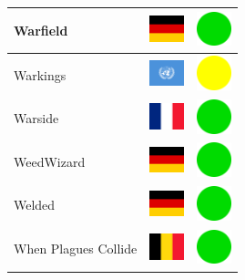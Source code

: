 \documentclass[12pt, a4paper, twoside]{report}
\begin{document}
\begin{center}
\begin{longtable}{|p{5cm}|p{2cm}|p{2cm}|}
 Warfield                                                   & \includegraphics[width=1cm]{../4x3/de} &   \includegraphics[width=1cm]{../likes/y} \\ \hline
 Warkings                                                   & \includegraphics[width=1cm]{../4x3/un} &   \includegraphics[width=1cm]{../likes/m} \\ \hline
 Warside                                                    & \includegraphics[width=1cm]{../4x3/fr} &   \includegraphics[width=1cm]{../likes/y} \\ \hline
 WeedWizard                                                 & \includegraphics[width=1cm]{../4x3/de} &   \includegraphics[width=1cm]{../likes/y} \\ \hline
 Welded                                                     & \includegraphics[width=1cm]{../4x3/de} &   \includegraphics[width=1cm]{../likes/y} \\ \hline
 When Plagues Collide                                       & \includegraphics[width=1cm]{../4x3/be} &   \includegraphics[width=1cm]{../likes/y} \\ \hline

\end{longtable}
\end{center}
\end{document}

